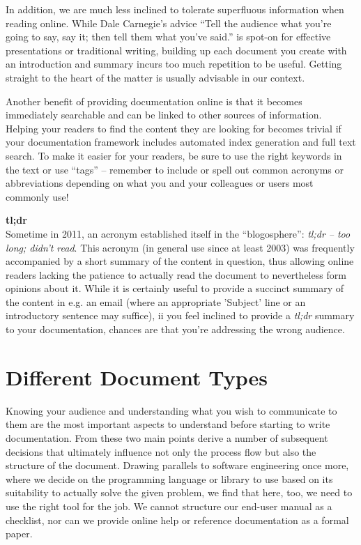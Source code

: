 In addition, we are much less inclined to tolerate
superfluous information when reading online.  While
Dale Carnegie's advice
``Tell the audience what you're going to say, say it;
then tell them what you've said.'' is spot-on for
effective presentations or traditional writing,
building up each document you create with an
introduction and summary incurs too much repetition to
be useful.  Getting straight to the heart of the
matter is usually advisable in our context.

Another benefit of providing documentation online is
that it becomes immediately searchable and can be
linked to other sources of information.  Helping your
readers to find the content they are looking for
becomes trivial if your documentation framework
includes automated index generation and full text
search.  To make it easier for your readers, be sure
to use the right keywords in the text or use ``tags''
-- remember to include or spell out common acronyms or
abbreviations depending on what you and your
colleagues or users most commonly use!

\begin{sidenote}
{\bf tl;dr} \\
Sometime in 2011, an acronym established itself in the
``blogosphere'': {\em tl;dr -- too long; didn't read}.
This acronym (in general use since at least 2003)  was
frequently accompanied by a short summary of the
content in question, thus allowing online readers
lacking the patience to actually read the document to
nevertheless form opinions about it.  While it is
certainly useful to provide a succinct summary of the
content in e.g. an email (where an appropriate
'Subject' line or an introductory sentence may
suffice), ii you feel inclined to provide a {\em
tl;dr} summary to your documentation,
chances are that you're addressing the wrong
audience.
\end{sidenote}


\section{Different Document Types}
\label{documentation:types}

Knowing your audience and understanding what you wish
to communicate to them are the most important aspects
to understand before starting to write documentation.
From these two main points derive a number of
subsequent decisions that ultimately influence not
only the process flow but also the structure of the
document.  Drawing parallels to software engineering
once more, where we decide on the programming language
or library to use based on its suitability to actually
solve the given problem, we find that here, too, we
need to use the right tool for the job.  We cannot
structure our end-user manual as a checklist, nor can
we provide online help or reference documentation as a
formal paper.

